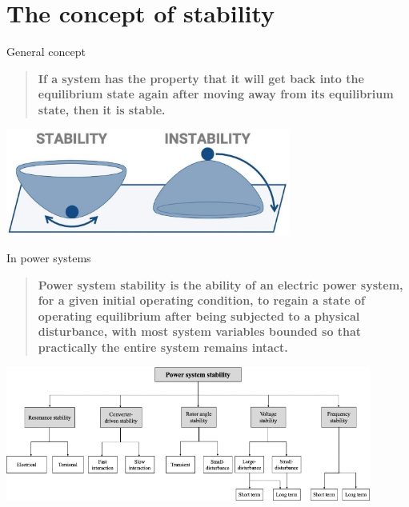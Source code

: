 \section{The concept of stability}
\begin{frame}{General concept}
\begin{quote}
    \textbf{If a system has the property that it will get back into the equilibrium state 
    again after moving away from its equilibrium state, then it is stable.} \cite{keviczky2018stability}
\end{quote}
\vspace{0.5cm}
\begin{center}
\includegraphics[width=0.7\textwidth]{images/ConceptOfStability.png}
\end{center}
\end{frame}

\begin{frame}[allowframebreaks]{In power systems}
\begin{quote}
    \textbf{Power system stability is the ability of an electric power system, 
    for a given initial operating condition, to regain a state of operating equilibrium 
    after being subjected to a physical disturbance, with most system variables bounded 
    so that practically the entire system remains intact.} \cite{hatziargyriou2020definition}
\end{quote}
\vspace{0.5cm}
\begin{center}
\includegraphics[width=0.9\textwidth]{images/ClassificationStability.png}
\end{center}
\end{frame}


